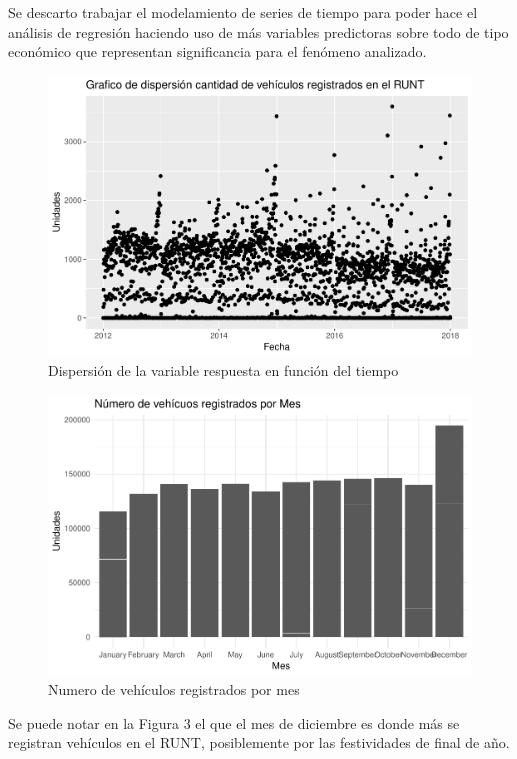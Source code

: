 \documentclass[11pt,twoside]{article}
\begin{document}
\noindent Se descarto trabajar el modelamiento de series de tiempo para poder hace el análisis de regresión haciendo uso de más variables predictoras sobre todo de tipo económico que representan significancia para el fenómeno analizado.
\begin{figure}[H]
    \centering
	\includegraphics{xxx.pdf}
	\caption{Dispersión de la variable respuesta en función del tiempo}
\end{figure}
\begin{figure}[H]
    \centering
	\includegraphics{pormes.pdf}
	\caption{Numero de vehículos registrados por mes}
\end{figure}
\noindent
Se puede notar en la Figura 3 el que el mes de diciembre es donde más se registran vehículos en el RUNT, posiblemente por las festividades de final de año.
\end{document}
